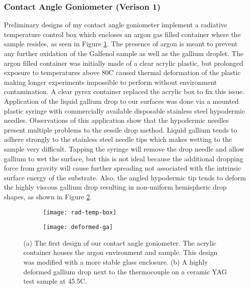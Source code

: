 
\subsubsection{Contact Angle Goniometer (Verison 1)}
Preliminary designs of my contact angle goniometer implement a radiative temperature control box which encloses an argon gas filled container where the sample resides, as seen in Figure \ref{fig:rad-temp-box}.  The presence of argon is meant to prevent any further oxidation of the Galfenol sample as well as the gallium droplet. The argon filled container was initially made of a clear acrylic plastic, but prolonged exposure to temperatures above 80\degree C caused thermal deformation of the plastic making longer experiments impossible to perform without environment contamination.  A clear pyrex container replaced the acrylic box to fix this issue.  Application of the liquid gallium drop to our surfaces was done via a mounted plastic syringe with commercially available disposable stainless steel hypodermic needles.  Observations of this application show that the hypodermic needles present multiple problems to the sessile drop method.  Liquid gallium tends to adhere strongly to the stainless steel needle tips which makes wetting to the sample very difficult.  Tapping the syringe will remove the drop needle and allow gallium to wet the surface, but this is not ideal because the additional dropping force from gravity will cause further spreading not associated with the intrinsic surface energy of the substrate.  Also, the angled hypodermic tip tends to deform the highly viscous gallium drop resulting in non-uniform hemispheric drop shapes, as shown in Figure \ref{fig:deformed-ga}.
\begin{figure}
	\centering
	\begin{subfigure}[c]{0.45\textwidth}
		\texttt{[image: rad-temp-box]}
		\subcaption{~}
		\label{fig:rad-temp-box}		
	\end{subfigure}
	\begin{subfigure}[c]{0.45\textwidth} 
		\texttt{[image: deformed-ga]}
		\subcaption{~}
		\label{fig:deformed-ga}		
	\end{subfigure}
	\caption{(a) The first design of our contact angle goniometer.  The acrylic container houses the argon environment and sample.  This design was modified with a more stable glass enclosure. (b) A highly deformed gallium drop next to the thermocouple on a ceramic YAG test sample at 45.5\degree C.}
	\label{fig:prelim-design}
\end{figure}

